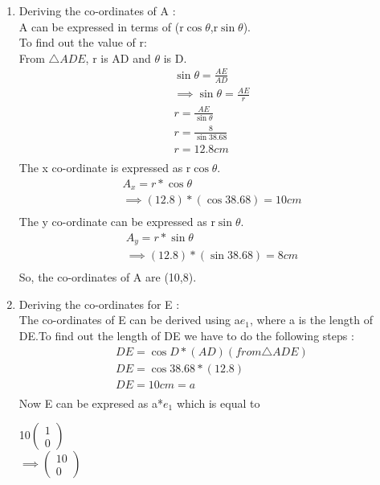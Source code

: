 \documentclass{article}
\newcommand{\myvec}[1]{\ensuremath{\begin{pmatrix}#1\end{pmatrix}}}
\begin{document}
\begin{enumerate}
\item Deriving the co-ordinates of A :\\
	A can be expressed in terms of (r$\cos{\theta}$,r$\sin{\theta}$).\\
To find out the value of r:\\
		From $\triangle{ADE}$, r is AD and $\theta$ is D.\\
		\begin{align}
		\sin{\theta} = \frac{AE}{AD}\\
		\implies \sin{\theta} = \frac{AE}{r}\\
			r = \frac{AE}{\sin{\theta}}\\
			r = \frac{8}{\sin{38.68}}\\
			r = 12.8cm\\
		\end{align}
The x co-ordinate is expressed as r$\cos{\theta}$.\\
		\begin{align}
			A_x = r * \cos{\theta}\\
			\implies (12.8) * (\cos{38.68}) = 10cm\\
		\end{align}
The y co-ordinate can be expressed as r$\sin{\theta}$.\\
		\begin{align}
			A_y = r * \sin{\theta}\\
			\implies (12.8) * (\sin{38.68}) = 8cm\\
		\end{align}
So, the co-ordinates of A are (10,8).
\item Deriving the co-ordinates for E :\\
The co-ordinates of E can be derived using a$e_1$, where a is the length of DE.To find out the length of DE we have to do the following steps : \\
		\begin{align}
			DE = \cos{D} * (AD) (from \triangle{ADE})\\
			DE = \cos{38.68} * (12.8) \\
			DE = 10cm = a\\
		\end{align}
Now E can be expresed as a*$e_1$ which is equal to
		\begin{center}
			10\myvec{1\\0}\\
			$\implies$\myvec{10\\0}\\

\end{center}
\end{enumerate}
\end{document}
